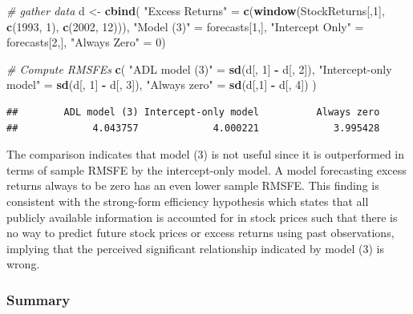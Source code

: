 \documentclass[]{book}
\newenvironment{Shaded}{\begin{snugshade}}{\end{snugshade}}
\newcommand{\KeywordTok}[1]{\textcolor[rgb]{0.13,0.29,0.53}{\textbf{#1}}}
\newcommand{\DecValTok}[1]{\textcolor[rgb]{0.00,0.00,0.81}{#1}}
\newcommand{\StringTok}[1]{\textcolor[rgb]{0.31,0.60,0.02}{#1}}
\newcommand{\CommentTok}[1]{\textcolor[rgb]{0.56,0.35,0.01}{\textit{#1}}}
\newcommand{\OperatorTok}[1]{\textcolor[rgb]{0.81,0.36,0.00}{\textbf{#1}}}
\newcommand{\NormalTok}[1]{#1}
\theoremstyle{definition}
\theoremstyle{definition}
\theoremstyle{definition}
\theoremstyle{remark}
\begin{document}
\begin{Shaded}
\begin{Highlighting}[]
\CommentTok{# gather data}
\NormalTok{d <-}\StringTok{ }\KeywordTok{cbind}\NormalTok{(}
  \StringTok{"Excess Returns"}\NormalTok{ =}\StringTok{ }\KeywordTok{c}\NormalTok{(}\KeywordTok{window}\NormalTok{(StockReturns[,}\DecValTok{1}\NormalTok{], }\KeywordTok{c}\NormalTok{(}\DecValTok{1993}\NormalTok{, }\DecValTok{1}\NormalTok{), }\KeywordTok{c}\NormalTok{(}\DecValTok{2002}\NormalTok{, }\DecValTok{12}\NormalTok{))),}
  \StringTok{"Model (3)"}\NormalTok{ =}\StringTok{ }\NormalTok{forecasts[}\DecValTok{1}\NormalTok{,], }
  \StringTok{"Intercept Only"}\NormalTok{ =}\StringTok{ }\NormalTok{forecasts[}\DecValTok{2}\NormalTok{,], }
  \StringTok{"Always Zero"}\NormalTok{ =}\StringTok{  }\DecValTok{0}\NormalTok{)}

\CommentTok{# Compute RMSFEs}
\KeywordTok{c}\NormalTok{(}
  \StringTok{"ADL model (3)"}\NormalTok{ =}\StringTok{ }\KeywordTok{sd}\NormalTok{(d[, }\DecValTok{1}\NormalTok{] }\OperatorTok{-}\StringTok{ }\NormalTok{d[, }\DecValTok{2}\NormalTok{]),}
  \StringTok{"Intercept-only model"}\NormalTok{ =}\StringTok{ }\KeywordTok{sd}\NormalTok{(d[, }\DecValTok{1}\NormalTok{] }\OperatorTok{-}\StringTok{ }\NormalTok{d[, }\DecValTok{3}\NormalTok{]),}
  \StringTok{"Always zero"}\NormalTok{ =}\StringTok{ }\KeywordTok{sd}\NormalTok{(d[,}\DecValTok{1}\NormalTok{] }\OperatorTok{-}\StringTok{ }\NormalTok{d[, }\DecValTok{4}\NormalTok{])}
\NormalTok{)}
\end{Highlighting}
\end{Shaded}

\begin{verbatim}
##        ADL model (3) Intercept-only model          Always zero 
##             4.043757             4.000221             3.995428
\end{verbatim}

The comparison indicates that model (3) is not useful since it is
outperformed in terms of sample RMSFE by the intercept-only model. A
model forecasting excess returns always to be zero has an even lower
sample RMSFE. This finding is consistent with the strong-form efficiency
hypothesis which states that all publicly available information is
accounted for in stock prices such that there is no way to predict
future stock prices or excess returns using past observations, implying
that the perceived significant relationship indicated by model (3) is
wrong.

\subsubsection*{Summary}\label{summary}
\end{document}

